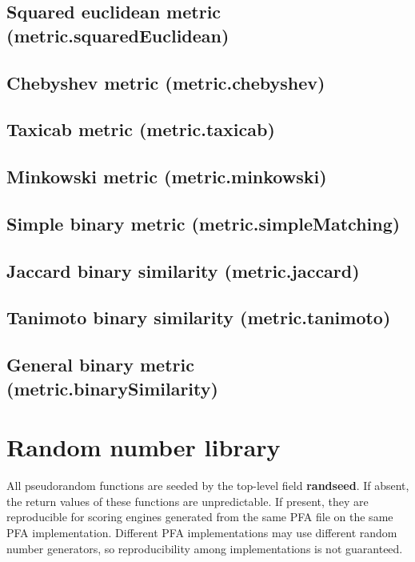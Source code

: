 \documentclass{article}
\newcommand{\PFAc}{\ttfamily\bfseries}
\theoremstyle{definition}
\begin{document}
\subsection{Squared euclidean metric (metric.squaredEuclidean)}

\subsection{Chebyshev metric (metric.chebyshev)}

\subsection{Taxicab metric (metric.taxicab)}

\subsection{Minkowski metric (metric.minkowski)}

\subsection{Simple binary metric (metric.simpleMatching)}

\subsection{Jaccard binary similarity (metric.jaccard)}

\subsection{Tanimoto binary similarity (metric.tanimoto)}

\subsection{General binary metric (metric.binarySimilarity)}

\pagebreak

\section{Random number library}

All pseudorandom functions are seeded by the top-level field {\PFAc randseed}.  If absent, the return values of these functions are unpredictable.  If present, they are reproducible for scoring engines generated from the same PFA file on the same PFA implementation.  Different PFA implementations may use different random number generators, so reproducibility among implementations is not guaranteed.
\end{document}
